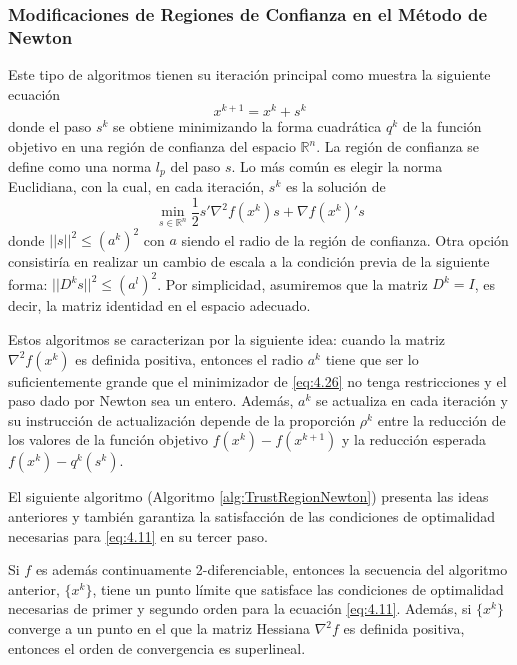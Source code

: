 \subsubsection{Modificaciones de Regiones de Confianza en el Método de Newton}

Este tipo de algoritmos tienen su iteración principal como muestra la siguiente ecuación
\begin{equation*}
x^{k+1} = x^k + s^k
\end{equation*}
donde el paso $s^k$ se obtiene minimizando la forma cuadrática $q^k$ de la función objetivo en una región de confianza del espacio $\mathbb{R}^n$. 
La región de confianza se define como una norma $l_p$ del paso $s$. 
Lo más común es elegir la norma Euclidiana, con la cual, en cada iteración, $s^k$ es la solución de 
\begin{equation*}
\min_{s\in\mathbb{R}^n}\dfrac{1}{2}s'\nabla^2 f(x^k)s + \nabla f(x^k)'s
\label{eq:4.26}
\end{equation*}
donde $||s||^2 \leq (a^k)^2$ con $a$ siendo el radio de la región de confianza. 
Otra opción consistiría en realizar un cambio de escala a la condición previa de la siguiente forma: $||D^ks||^2\leq (a^l)^2$. 
Por simplicidad, asumiremos que la matriz $D^k=I$, es decir, la matriz identidad en el espacio adecuado.

Estos algoritmos se caracterizan por la siguiente idea: cuando la matriz $\nabla^2 f(x^k)$ es definida positiva, entonces el radio $a^k$ tiene que ser lo suficientemente grande que el minimizador de \ref{eq:4.26} no tenga restricciones y el paso dado por Newton sea un entero. 
Además, $a^k$ se actualiza en cada iteración y su instrucción de actualización depende de la proporción $\rho^k$ entre la reducción de los valores de la función objetivo $f(x^k)-f(x^{k+1})$ y la reducción esperada $f(x^k)-q^k(s^k).$

El siguiente algoritmo (Algoritmo \ref{alg:TrustRegionNewton}) presenta las ideas anteriores y también garantiza la satisfacción de las condiciones de optimalidad necesarias para \ref{eq:4.11} en su tercer paso. 

Si $f$ es además continuamente 2-diferenciable, entonces la secuencia del algoritmo anterior, $\{x^k\}$, tiene un punto límite que satisface las condiciones de optimalidad necesarias de primer y segundo orden para la ecuación \ref{eq:4.11}. 
Además, si $\{x^k\}$ converge a un punto en el que la matriz Hessiana $\nabla^2f$ es definida positiva, entonces el orden de convergencia es superlineal. 

